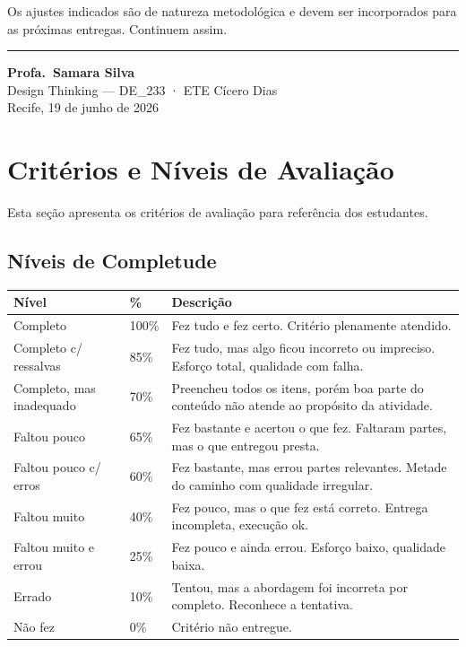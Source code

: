 \documentclass[
  sigconf,
  nonacm, %
  language=portuguese
]{acmart}
\begin{document}
Os ajustes indicados são de natureza metodológica e devem ser
incorporados para as próximas entregas.
Continuem assim.


\vspace{1.5em}
\noindent\rule{\linewidth}{0.4pt}

\begin{flushright}
\textbf{Profa.\ Samara Silva}\\
{\small\color{cmuted} Design Thinking --- DE\_233 · ETE Cícero Dias}\\
{\small\color{cmuted} Recife, 19 de junho de 2026}
\end{flushright}


\appendix
\onecolumn
\section{Critérios e Níveis de Avaliação}

Esta seção apresenta os critérios de avaliação para referência dos estudantes.

\subsection{Níveis de Completude}

\begin{tabularx}{\linewidth}{@{} p{4cm} p{1.5cm} X @{}}
\toprule
\textbf{Nível} & \textbf{\%} & \textbf{Descrição} \\
\midrule
Completo & 100\% & Fez tudo e fez certo. Critério plenamente atendido. \\
Completo c/ ressalvas & 85\% & Fez tudo, mas algo ficou incorreto ou impreciso. Esforço total, qualidade com falha. \\
Completo, mas inadequado & 70\% & Preencheu todos os itens, porém boa parte do conteúdo não atende ao propósito da atividade. \\
Faltou pouco & 65\% & Fez bastante e acertou o que fez. Faltaram partes, mas o que entregou presta. \\
Faltou pouco c/ erros & 60\% & Fez bastante, mas errou partes relevantes. Metade do caminho com qualidade irregular. \\
Faltou muito & 40\% & Fez pouco, mas o que fez está correto. Entrega incompleta, execução ok. \\
Faltou muito e errou & 25\% & Fez pouco e ainda errou. Esforço baixo, qualidade baixa. \\
Errado & 10\% & Tentou, mas a abordagem foi incorreta por completo. Reconhece a tentativa. \\
Não fez & 0\% & Critério não entregue. \\
\bottomrule
\end{tabularx}
\end{document}
